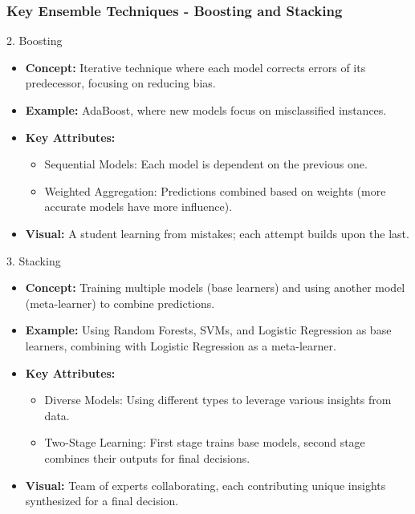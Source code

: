 \documentclass[aspectratio=169]{beamer}
\begin{document}
\begin{frame}[fragile]
    \frametitle{Key Ensemble Techniques - Boosting and Stacking}
    \begin{block}{2. Boosting}
        \begin{itemize}
            \item \textbf{Concept:} Iterative technique where each model corrects errors of its predecessor, focusing on reducing bias.
            \item \textbf{Example:} AdaBoost, where new models focus on misclassified instances.
            \item \textbf{Key Attributes:}
            \begin{itemize}
                \item Sequential Models: Each model is dependent on the previous one.
                \item Weighted Aggregation: Predictions combined based on weights (more accurate models have more influence).
            \end{itemize}
            \item \textbf{Visual:} A student learning from mistakes; each attempt builds upon the last.
        \end{itemize}
    \end{block}

    \begin{block}{3. Stacking}
        \begin{itemize}
            \item \textbf{Concept:} Training multiple models (base learners) and using another model (meta-learner) to combine predictions.
            \item \textbf{Example:} Using Random Forests, SVMs, and Logistic Regression as base learners, combining with Logistic Regression as a meta-learner.
            \item \textbf{Key Attributes:}
            \begin{itemize}
                \item Diverse Models: Using different types to leverage various insights from data.
                \item Two-Stage Learning: First stage trains base models, second stage combines their outputs for final decisions.
            \end{itemize}
            \item \textbf{Visual:} Team of experts collaborating, each contributing unique insights synthesized for a final decision.
        \end{itemize}
    \end{block}
\end{frame}
\end{document}

